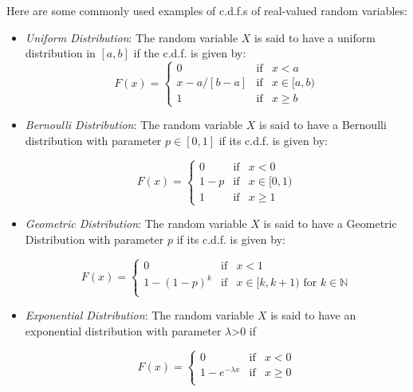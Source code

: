\documentclass[11pt]{article} %
\begin{document}
Here are some commonly used examples of c.d.f.s of real-valued random variables:

\begin{itemize}
\item \emph{Uniform Distribution}: The random variable $X$ is said to have a uniform distribution in $[a,b]$ if the c.d.f. is given by:
\begin{equation*}
F(x) = 
\left\{
\begin{array}{ccc}
0  & \text{if}  & x < a   \\
x-a/[b-a]  & \text{if}  & x \in [a,b)   \\
1 & \text{if}  & x \geq b
\end{array}
\right.
\end{equation*}

\item \emph{Bernoulli Distribution}: The random variable $X$ is said to have a Bernoulli distribution with parameter $p \in [0,1]$ if its c.d.f. is given by:

\begin{equation*}
F(x) = 
\left\{
\begin{array}{ccc}
0  & \text{if}  & x < 0   \\
1-p  & \text{if}  & x \in [0,1)   \\
1 & \text{if}  & x \geq 1
\end{array}
\right.
\end{equation*}

\item \emph{Geometric Distribution}: The random variable $X$ is said to have a Geometric Distribution with parameter $p$ if its c.d.f. is given by:

\begin{equation*}
F(x) = 
\left\{
\begin{array}{ccc}
0  & \text{if}  & x < 1   \\
1-(1-p)^{k}  & \text{if}  & x \in [k,k+1) \text{ for } k \in \mathbb{N} \\
\end{array}
\right.
\end{equation*}


\item \emph{Exponential Distribution}: The random variable $X$ is said to have an exponential distribution with parameter $\lambda$>0 if

\begin{equation*}
F(x) = 
\left\{
\begin{array}{ccc}
0  & \text{if}  & x < 0   \\
1-e^{-\lambda x}  & \text{if}  & x \geq 0   \\
\end{array}
\right.
\end{equation*}


\end{itemize}
\end{document}
